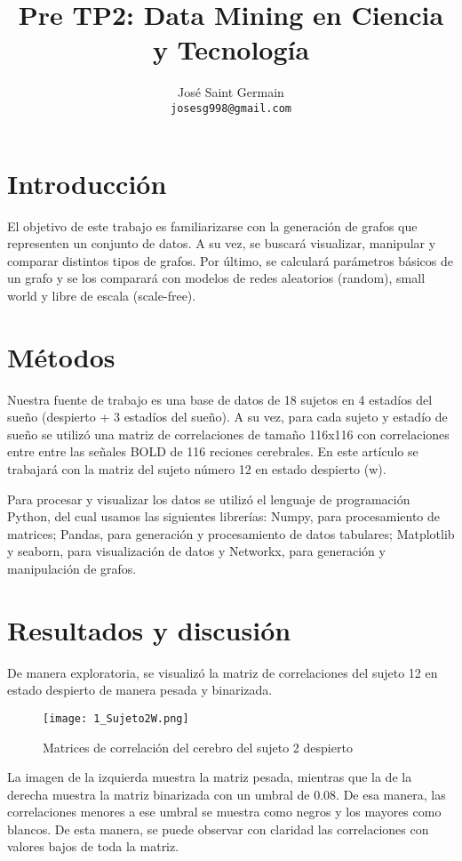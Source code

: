 \documentclass{article}
\title{Pre TP2: Data Mining en Ciencia y Tecnología}
\author{%
  José Saint Germain\\
  \texttt{josesg998@gmail.com} \\
}
\begin{document}
\maketitle

\section{Introducción}

El objetivo de este trabajo es familiarizarse con la generación de grafos
que representen un conjunto de datos. A su vez, se buscará visualizar,
manipular y comparar distintos tipos de grafos. Por último, se calculará
parámetros básicos de un grafo y se los comparará con modelos de redes
aleatorios (random), small world y libre de escala (scale-free).

\section{Métodos}
Nuestra fuente de trabajo es una base de datos de 18 sujetos en
4 estadíos del sueño (despierto + 3 estadíos del sueño). A su vez, para cada 
sujeto y estadío de sueño se utilizó una matriz de correlaciones de tamaño 
116x116 con correlaciones entre entre las señales BOLD de 116 reciones
cerebrales. En este artículo se trabajará con la matriz del sujeto número 12
en estado despierto (w).


Para procesar y visualizar los datos se utilizó el lenguaje de programación
Python, del cual usamos las siguientes librerías: Numpy, para procesamiento 
de matrices; Pandas, para generación y procesamiento de datos tabulares; 
Matplotlib y seaborn, para visualización de datos y Networkx, para generación 
y manipulación de grafos.

\section{Resultados y discusión}

De manera exploratoria, se visualizó la matriz de correlaciones del sujeto 12
en estado despierto de manera pesada y binarizada.

\begin{figure}[H]
  \centering  
  \texttt{[image: 1\_Sujeto2W.png]}
  \caption{Matrices de correlación del cerebro del sujeto 2 despierto}
\end{figure}

La imagen de la izquierda muestra la matriz pesada, mientras que la de la 
derecha muestra la matriz binarizada con un umbral de 0.08. De esa manera,
las correlaciones menores a ese umbral se muestra como negros y los mayores
como blancos. De esta manera, se puede observar con claridad las correlaciones
con valores bajos de toda la matriz.
\end{document}
